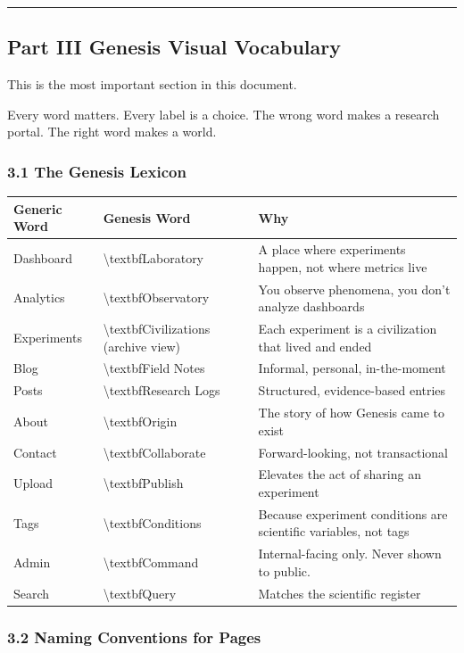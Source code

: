\documentclass[11pt,a4paper]{article}
\begin{document}
\noindent\rule{\textwidth}{0.4pt}

\subsection*{Part III  Genesis Visual Vocabulary}

This is the most important section in this document.

Every word matters. Every label is a choice. The wrong word makes a research portal. The right word makes a world.

\subsubsection*{3.1 The Genesis Lexicon}

\begin{longtable}{lll}
\toprule
Generic Word & Genesis Word & Why \\
\midrule
\endhead
Dashboard & \textbackslash{}textbf{Laboratory} & A place where experiments happen, not where metrics live \\
Analytics & \textbackslash{}textbf{Observatory} & You observe phenomena, you don't analyze dashboards \\
Experiments & \textbackslash{}textbf{Civilizations} (archive view) & Each experiment is a civilization that lived and ended \\
Blog & \textbackslash{}textbf{Field Notes} & Informal, personal, in-the-moment \\
Posts & \textbackslash{}textbf{Research Logs} & Structured, evidence-based entries \\
About & \textbackslash{}textbf{Origin} & The story of how Genesis came to exist \\
Contact & \textbackslash{}textbf{Collaborate} & Forward-looking, not transactional \\
Upload & \textbackslash{}textbf{Publish} & Elevates the act of sharing an experiment \\
Tags & \textbackslash{}textbf{Conditions} & Because experiment conditions are scientific variables, not tags \\
Admin & \textbackslash{}textbf{Command} & Internal-facing only. Never shown to public. \\
Search & \textbackslash{}textbf{Query} & Matches the scientific register \\
\bottomrule
\end{longtable}

\subsubsection*{3.2 Naming Conventions for Pages}
\end{document}
